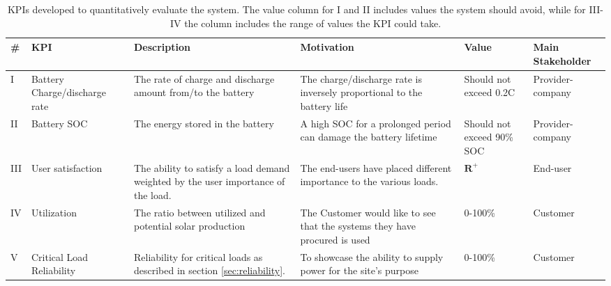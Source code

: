 \begin{table}[h]
    \centering
    \begin{tabular}{|p{0.5cm}|p{2.5cm}|p{3cm}|p{4cm}|p{2.2cm}|p{2cm}|}
        \hline
        \#&\textbf{KPI} & \textbf{Description} & \textbf{Motivation} & \textbf{Value} & \textbf{Main Stakeholder} \\
        \hline
        I&Battery Charge/discharge rate & The rate of charge and discharge amount from/to the battery  & The charge/discharge rate is inversely proportional to the battery life & Should not exceed 0.2C & Provider-company \\
        \hline
        II&Battery SOC & The energy stored in the battery & A high SOC for a prolonged period can damage the battery lifetime  & Should not exceed 90\% SOC & Provider-company \\
        \hline
        III&User satisfaction & The ability to satisfy a load demand weighted by the user importance of the load.  & The end-users have placed different importance to the various loads.  & $\mathbf{R}^+$ & End-user  \\
        \hline
        IV&Utilization & The ratio between utilized and potential solar production & The Customer would like to see that the systems they have procured is used  & 0-100\% & Customer \\
        \hline
        V&Critical Load Reliability & Reliability for critical loads as described in section \ref{sec:reliability}. & To showcase the ability to supply power for the site's purpose & 0-100\% & Customer \\
        \hline
    \end{tabular}
    \caption[KPIs]{KPIs developed to quantitatively evaluate the system. The value column for I and II includes values the system should avoid, while for III-IV the column includes the range of values the KPI could take. }
    \label{tab:KPI}
\end{table}

